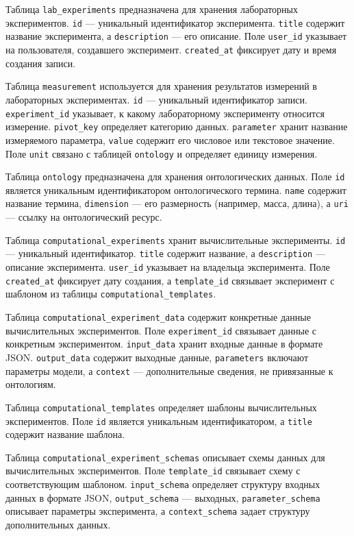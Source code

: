 Таблица \texttt{lab\_experiments} предназначена для хранения лабораторных экспериментов. \texttt{id} — уникальный идентификатор эксперимента. \texttt{title} содержит название эксперимента, а \texttt{description} — его описание. Поле \texttt{user\_id} указывает на пользователя, создавшего эксперимент. \texttt{created\_at} фиксирует дату и время создания записи.

Таблица \texttt{measurement} используется для хранения результатов измерений в лабораторных экспериментах. \texttt{id} — уникальный идентификатор записи. \texttt{experiment\_id} указывает, к какому лабораторному эксперименту относится измерение. \texttt{pivot\_key} определяет категорию данных. \texttt{parameter} хранит название измеряемого параметра, \texttt{value} содержит его числовое или текстовое значение. Поле \texttt{unit} связано с таблицей \texttt{ontology} и определяет единицу измерения.

Таблица \texttt{ontology} предназначена для хранения онтологических данных. Поле \texttt{id} является уникальным идентификатором онтологического термина. \texttt{name} содержит название термина, \texttt{dimension} — его размерность (например, масса, длина), а \texttt{uri} — ссылку на онтологический ресурс.

Таблица \texttt{computational\_experiments} хранит вычислительные эксперименты. \texttt{id} — уникальный идентификатор. \texttt{title} содержит название, а \texttt{description} — описание эксперимента. \texttt{user\_id} указывает на владельца эксперимента. Поле \texttt{created\_at} фиксирует дату создания, а \texttt{template\_id} связывает эксперимент с шаблоном из таблицы \texttt{computational\_templates}.

Таблица \texttt{computational\_experiment\_data} содержит конкретные данные вычислительных экспериментов. Поле \texttt{experiment\_id} связывает данные с конкретным экспериментом. \texttt{input\_data} хранит входные данные в формате JSON. \texttt{output\_data} содержит выходные данные, \texttt{parameters} включают параметры модели, а \texttt{context} — дополнительные сведения, не привязанные к онтологиям.

Таблица \texttt{computational\_templates} определяет шаблоны вычислительных экспериментов. Поле \texttt{id} является уникальным идентификатором, а \texttt{title} содержит название шаблона.

Таблица \texttt{computational\_experiment\_schemas} описывает схемы данных для вычислительных экспериментов. Поле \texttt{template\_id} связывает схему с соответствующим шаблоном. \texttt{input\_schema} определяет структуру входных данных в формате JSON, \texttt{output\_schema} — выходных, \texttt{parameter\_schema} описывает параметры эксперимента, а \texttt{context\_schema} задает структуру дополнительных данных.

